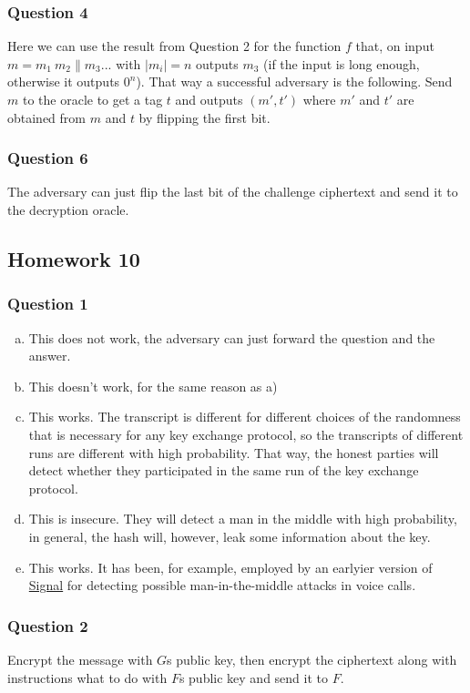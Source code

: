 \documentclass{article}
\numberwithin{defn}{section}
\numberwithin{equation}{section}
\begin{document}
	\subsubsection*{Question 4}
	Here we can use the result from Question 2 for the function $f$ that, on input $m=m_1\ m_2\|m_3...$ with $|m_i|=n$ outputs $m_3$ (if the input is long enough, otherwise it outputs $0^n$). That way a successful adversary is the following. Send $m$ to the oracle to get a tag $t$ and outputs $(m', t')$ where $m'$ and $t'$ are obtained from $m$ and $t$ by flipping the first bit.
	
	\subsubsection*{Question 6}
	
	The adversary can just flip the last bit of the challenge ciphertext and send it to the decryption oracle.
	
\subsection*{Homework 10}

	\subsubsection*{Question 1}
	\begin{enumerate}[a)]
		\item This does not work, the adversary can just forward the question and the answer.
		\item This doesn't work, for the same reason as a)
		\item This works. The transcript is different for different choices of the randomness that is necessary for any key exchange protocol, so the transcripts of different runs are different with high probability. That way, the honest parties will detect whether they participated in the same run of the key exchange protocol.
		\item This is insecure. They will detect a man in the middle with high probability, in general, the hash will, however, leak some information about the key.
		\item This works. It has been, for example, employed by an earlyier version of \href{https://signal.org/}{Signal} for detecting possible man-in-the-middle attacks in voice calls.
	\end{enumerate}
	\subsubsection*{Question 2}
	Encrypt the message with $G$s public key, then encrypt the ciphertext along with instructions what to do with $F$s public key and send it to $F$.
	


\end{document}
